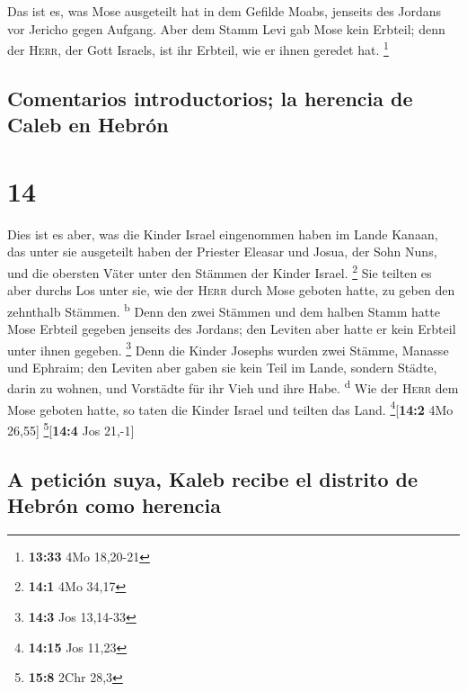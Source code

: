  Das ist es, was Mose ausgeteilt hat in dem Gefilde
Moabs, jenseits des Jordans vor Jericho gegen Aufgang. 
Aber dem Stamm Levi gab Mose kein Erbteil; denn der \textsc{Herr}, der
Gott Israels, ist ihr Erbteil, wie er ihnen geredet hat. \footnote{\textbf{13:33}
  4Mo 18,20-21}

\hypertarget{comentarios-introductorios-la-herencia-de-caleb-en-hebruxf3n}{%
\subsection{Comentarios introductorios; la herencia de Caleb en
Hebrón}\label{comentarios-introductorios-la-herencia-de-caleb-en-hebruxf3n}}

\hypertarget{section-13}{%
\section{14}\label{section-13}}

 Dies ist es aber, was die Kinder Israel eingenommen haben
im Lande Kanaan, das unter sie ausgeteilt haben der Priester Eleasar und
Josua, der Sohn Nuns, und die obersten Väter unter den Stämmen der
Kinder Israel. \footnote{\textbf{14:1} 4Mo 34,17}  Sie
teilten es aber durchs Los unter sie, wie der \textsc{Herr} durch Mose
geboten hatte, zu geben den zehnthalb Stämmen. \textsuperscript{b}
 Denn den zwei Stämmen und dem halben Stamm hatte Mose
Erbteil gegeben jenseits des Jordans; den Leviten aber hatte er kein
Erbteil unter ihnen gegeben. \footnote{\textbf{14:3} Jos 13,14-33}
 Denn die Kinder Josephs wurden zwei Stämme, Manasse und
Ephraim; den Leviten aber gaben sie kein Teil im Lande, sondern Städte,
darin zu wohnen, und Vorstädte für ihr Vieh und ihre Habe.
\textsuperscript{d}  Wie der \textsc{Herr} dem Mose
geboten hatte, so taten die Kinder Israel und teilten das Land.
\footnote{\textbf{14:15} Jos 11,23}{[}\textbf{14:2} 4Mo 26,55{]}
\footnote{\textbf{15:8} 2Chr 28,3}{[}\textbf{14:4} Jos 21,-1{]}

\hypertarget{a-peticiuxf3n-suya-kaleb-recibe-el-distrito-de-hebruxf3n-como-herencia}{%
\subsection{A petición suya, Kaleb recibe el distrito de Hebrón como
herencia}\label{a-peticiuxf3n-suya-kaleb-recibe-el-distrito-de-hebruxf3n-como-herencia}}

